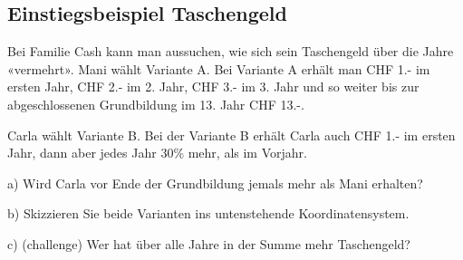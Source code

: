 

\newpage

\subsection{Einstiegsbeispiel Taschengeld}

Bei Familie Cash kann man aussuchen, wie sich sein Taschengeld über
die Jahre «vermehrt». Mani wählt Variante A. Bei Variante A erhält man
CHF 1.- im ersten Jahr, CHF 2.- im 2. Jahr, CHF 3.- im 3. Jahr und so
weiter bis zur abgeschlossenen Grundbildung im 13. Jahr CHF 13.-.

Carla wählt Variante B. Bei der Variante B erhält Carla auch CHF 1.-
im ersten Jahr, dann aber jedes Jahr 30\% mehr, als im Vorjahr.

a) Wird Carla vor Ende der Grundbildung jemals mehr als Mani erhalten?


b) Skizzieren Sie beide Varianten ins untenstehende Koordinatensystem.

c) (challenge) Wer hat über alle Jahre in der Summe mehr Taschengeld?





\newpage

